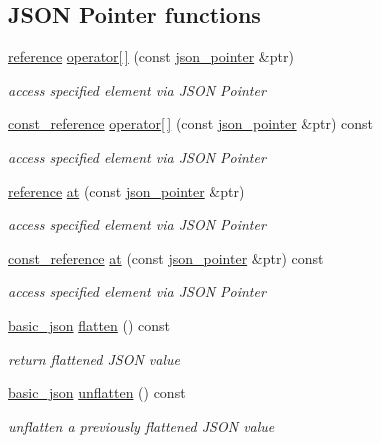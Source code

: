 \subsection*{J\+S\+O\+N Pointer functions}
\begin{DoxyCompactItemize}
\item 
\hyperlink{classnlohmann_1_1basic__json_a3ec8e17be8732fe436e9d6733f52b7a3}{reference} \hyperlink{classnlohmann_1_1basic__json_a7605b20debcc12fc44bd9f2075122a87}{operator\mbox{[}$\,$\mbox{]}} (const \hyperlink{classnlohmann_1_1basic__json_1_1json__pointer}{json\+\_\+pointer} \&ptr)
\begin{DoxyCompactList}\small\item\em access specified element via J\+S\+O\+N Pointer \end{DoxyCompactList}\item 
\hyperlink{classnlohmann_1_1basic__json_af677a29b0e66edc9f66e5167e4667071}{const\+\_\+reference} \hyperlink{classnlohmann_1_1basic__json_a76347b37f07c75049f5164053a6cf81a}{operator\mbox{[}$\,$\mbox{]}} (const \hyperlink{classnlohmann_1_1basic__json_1_1json__pointer}{json\+\_\+pointer} \&ptr) const 
\begin{DoxyCompactList}\small\item\em access specified element via J\+S\+O\+N Pointer \end{DoxyCompactList}\item 
\hyperlink{classnlohmann_1_1basic__json_a3ec8e17be8732fe436e9d6733f52b7a3}{reference} \hyperlink{classnlohmann_1_1basic__json_a649aef71e5d952499da7ad3b8e7c9236}{at} (const \hyperlink{classnlohmann_1_1basic__json_1_1json__pointer}{json\+\_\+pointer} \&ptr)
\begin{DoxyCompactList}\small\item\em access specified element via J\+S\+O\+N Pointer \end{DoxyCompactList}\item 
\hyperlink{classnlohmann_1_1basic__json_af677a29b0e66edc9f66e5167e4667071}{const\+\_\+reference} \hyperlink{classnlohmann_1_1basic__json_a0d46dd5ef4992fb80f9f0d9f56f16eae}{at} (const \hyperlink{classnlohmann_1_1basic__json_1_1json__pointer}{json\+\_\+pointer} \&ptr) const 
\begin{DoxyCompactList}\small\item\em access specified element via J\+S\+O\+N Pointer \end{DoxyCompactList}\item 
\hyperlink{classnlohmann_1_1basic__json}{basic\+\_\+json} \hyperlink{classnlohmann_1_1basic__json_a5327abb014dec211593b00959830650e}{flatten} () const 
\begin{DoxyCompactList}\small\item\em return flattened J\+S\+O\+N value \end{DoxyCompactList}\item 
\hyperlink{classnlohmann_1_1basic__json}{basic\+\_\+json} \hyperlink{classnlohmann_1_1basic__json_a0389c5dd86adc512e5826d7ff610f776}{unflatten} () const 
\begin{DoxyCompactList}\small\item\em unflatten a previously flattened J\+S\+O\+N value \end{DoxyCompactList}\end{DoxyCompactItemize}
